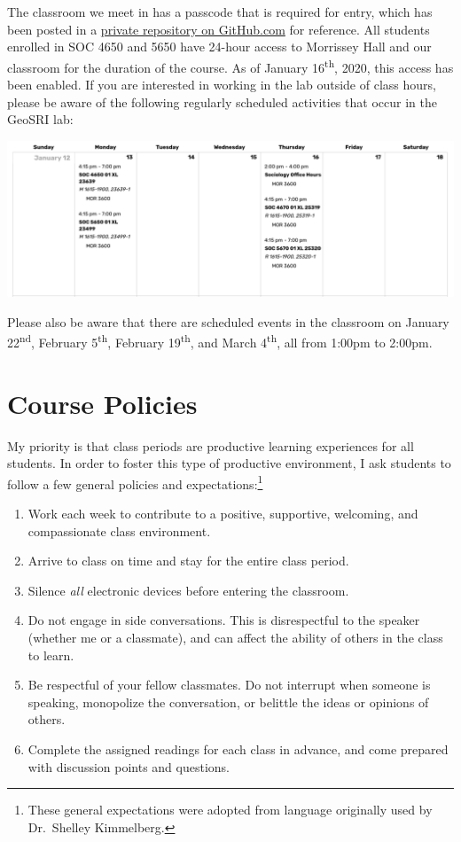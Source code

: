 \documentclass[]{book}
\providecommand{\tightlist}{%
  \setlength{\itemsep}{0pt}\setlength{\parskip}{0pt}}
\begin{document}
The classroom we meet in has a passcode that is required for entry, which has been posted in a \href{https://github.com/slu-soc5650/passcode}{private repository on GitHub.com} for reference. All students enrolled in SOC 4650 and 5650 have 24-hour access to Morrissey Hall and our classroom for the duration of the course. As of January 16\textsuperscript{th}, 2020, this access has been enabled. If you are interested in working in the lab outside of class hours, please be aware of the following regularly scheduled activities that occur in the GeoSRI lab:

\includegraphics[width=9\linewidth]{images/lab_hours}

Please also be aware that there are scheduled events in the classroom on January 22\textsuperscript{nd}, February 5\textsuperscript{th}, February 19\textsuperscript{th}, and March 4\textsuperscript{th}, all from 1:00pm to 2:00pm.

\hypertarget{course-policies}{%
\chapter{Course Policies}\label{course-policies}}

My priority is that class periods are productive learning experiences for all students. In order to foster this type of productive environment, I ask students to follow a few general policies and expectations:\footnote{These general expectations were adopted from language originally used by Dr.~Shelley Kimmelberg.}

\begin{enumerate}
\def\labelenumi{\arabic{enumi}.}
\tightlist
\item
  Work each week to contribute to a positive, supportive, welcoming, and compassionate class environment.
\item
  Arrive to class on time and stay for the entire class period.
\item
  Silence \emph{all} electronic devices before entering the classroom.
\item
  Do not engage in side conversations. This is disrespectful to the speaker (whether me or a classmate), and can affect the ability of others in the class to learn.
\item
  Be respectful of your fellow classmates. Do not interrupt when someone is speaking, monopolize the conversation, or belittle the ideas or opinions of others.
\item
  Complete the assigned readings for each class in advance, and come prepared with discussion points and questions.
\end{enumerate}
\end{document}
